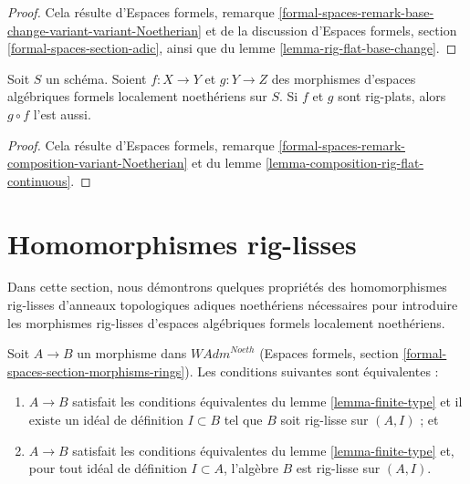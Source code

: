 \begin{proof}
Cela résulte d'Espaces formels, remarque
\ref{formal-spaces-remark-base-change-variant-variant-Noetherian}
et de la discussion d'Espaces formels, section
\ref{formal-spaces-section-adic},
ainsi que du
lemme \ref{lemma-rig-flat-base-change}.
\end{proof}

\begin{lemma}
\label{lemma-composition-rig-flat}
Soit $S$ un schéma. Soient $f : X \to Y$ et $g : Y \to Z$
des morphismes d'espaces algébriques formels localement noethériens sur $S$.
Si $f$ et $g$ sont rig-plats, alors $g \circ f$ l'est aussi.
\end{lemma}

\begin{proof}
Cela résulte d'Espaces formels, remarque
\ref{formal-spaces-remark-composition-variant-Noetherian}
et du lemme \ref{lemma-composition-rig-flat-continuous}.
\end{proof}










\section{Homomorphismes rig-lisses}
\label{section-rig-smooth-homomorphisms}

\noindent
Dans cette section, nous démontrons quelques propriétés des
homomorphismes rig-lisses d'anneaux topologiques
adiques noethériens nécessaires pour introduire les
morphismes rig-lisses d'espaces algébriques formels
localement noethériens.

\begin{lemma}
\label{lemma-rig-smooth-continuous}
Soit $A \to B$ un morphisme dans $\textit{WAdm}^{Noeth}$
(Espaces formels, section \ref{formal-spaces-section-morphisms-rings}).
Les conditions suivantes sont équivalentes :
\begin{enumerate}
\item[(a)] $A \to B$ satisfait les conditions équivalentes du
lemme \ref{lemma-finite-type} et il existe un idéal de définition
$I \subset B$ tel que $B$ soit rig-lisse sur $(A, I)$ ; et
\item[(b)] $A \to B$ satisfait les conditions équivalentes du
lemme \ref{lemma-finite-type} et, pour tout idéal de définition
$I \subset A$, l'algèbre $B$ est rig-lisse sur $(A, I)$.
\end{enumerate}
\end{lemma}

